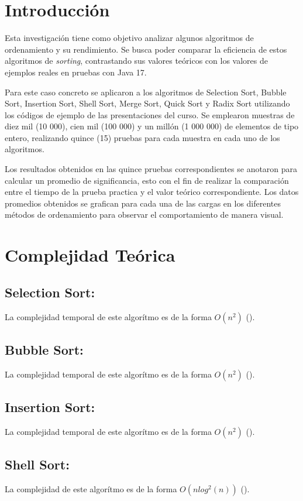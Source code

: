 \documentclass{report}
\begin{document}
	
	
	
	
	\section*{Introducción}
	Esta investigación tiene como objetivo analizar algunos algoritmos de ordenamiento y su rendimiento. Se busca poder comparar la eficiencia de estos algoritmos de \textit{sorting}, contrastando sus valores teóricos con los valores de ejemplos reales en pruebas con Java 17.
	
	Para este caso concreto se aplicaron a los algoritmos de Selection Sort, Bubble Sort, Insertion Sort, Shell Sort, Merge Sort, Quick Sort y Radix Sort utilizando los códigos de ejemplo de las presentaciones del curso. Se emplearon muestras de diez mil (10 000), cien mil (100 000) y un millón (1 000 000) de elementos de tipo entero, realizando quince (15) pruebas para cada muestra en cada uno de los algoritmos.
	
	Los resultados obtenidos en las quince pruebas correspondientes se anotaron para calcular un promedio de significancia, esto con el fin de realizar la comparación entre el tiempo de la prueba practica y el valor teórico correspondiente. Los datos promedios obtenidos se grafican para cada una de las cargas en los diferentes métodos de ordenamiento para observar el comportamiento de manera visual.
	
	\section*{Complejidad Teórica}
	
	\subsection*{Selection Sort:}
	La complejidad temporal de este algorítmo es de la forma $O(n^{2})$ (\cite{joyanes2006}).
	\subsection*{Bubble Sort:}
	La complejidad temporal de este algorítmo es de la forma $O(n^{2})$ (\cite{joyanes2006}).
	\subsection*{Insertion Sort:}
	La complejidad temporal de este algorítmo es de la forma $O(n^{2})$ (\cite{joyanes2006}).
	\subsection*{Shell Sort:}
	La complejidad de este algorítmo es de la forma $O(nlog^{2}(n))$ (\cite{ary2016}).
\end{document}
